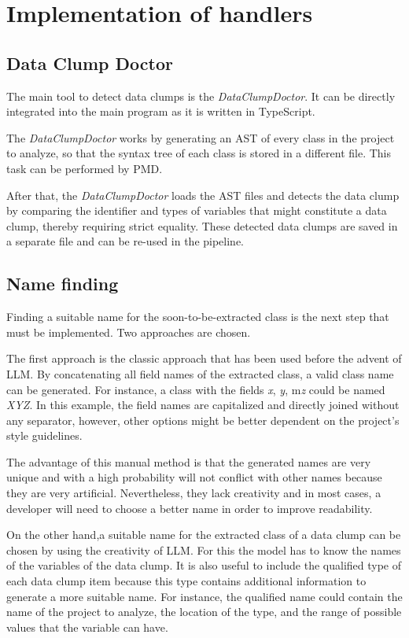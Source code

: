 \section{Implementation of handlers} \label{sec:step_impl}

\subsection{Data Clump Doctor}

The main tool to detect  data clumps is the \textit{DataClumpDoctor}. It can be directly integrated into the main program as it is written in TypeScript.

The \textit{DataClumpDoctor} works by generating an \ac{AST} of every class in the project to analyze, so that the syntax tree of each class is stored in a different file.  This task can be performed by PMD.

After that, the \textit{DataClumpDoctor} loads the \ac{AST} files and detects the data clump by comparing the identifier and types of variables that might constitute a data clump, thereby requiring strict equality. These detected data clumps are saved in a separate file and can be re-used in the pipeline. 


\subsection{Name finding}
Finding a suitable name for the soon-to-be-extracted class is the next step  that must be implemented. Two approaches are chosen.

The first approach is the classic approach that has been used before the advent of \acs{LLM}. By concatenating all field names of the extracted class, a valid class name can be generated. For instance, a class with the fields \textit{x}, \textit{y}, m\textit{z} could be named \textit{XYZ}. In this example, the field names are capitalized and directly joined without any separator, however, other options might be better dependent on the project's style guidelines. 

The advantage of this manual method is that the generated names are very unique and with a high probability will not conflict with other names because they are very artificial. Nevertheless, they lack creativity and in most cases, a developer will need to choose a better name in order to improve readability. 


On the other hand,a suitable name for the extracted class of a data clump can be chosen by using the creativity of \acs{LLM}.  For this the model has to know the names of the variables of the data clump. It is also useful to include the qualified type of each data clump item because this type contains additional information to generate a more suitable name. For instance, the qualified name could contain the name of the project to analyze, the location of the type, and the range of possible values that the variable can have.

